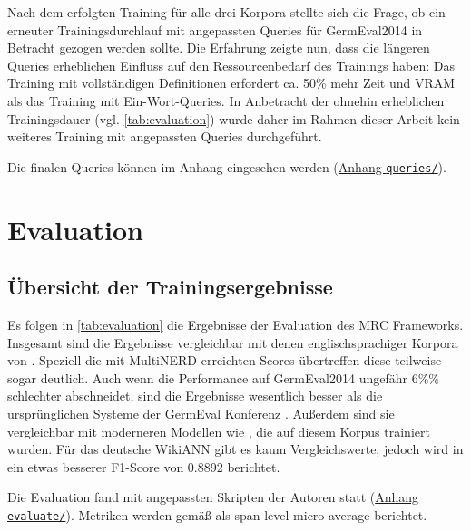 Nach dem erfolgten Training für alle drei Korpora stellte sich die Frage, ob ein erneuter Trainingsdurchlauf mit angepassten Queries für GermEval2014 in Betracht gezogen werden sollte. Die Erfahrung zeigte nun, dass die längeren Queries erheblichen Einfluss auf den Ressourcenbedarf des Trainings haben: Das Training mit vollständigen Definitionen erfordert ca. 50\% mehr Zeit und VRAM als das Training mit Ein-Wort-Queries. In Anbetracht der ohnehin erheblichen Trainingsdauer (vgl. \autoref{tab:evaluation}) wurde daher im Rahmen dieser Arbeit kein weiteres Training mit angepassten Queries durchgeführt.

Die finalen Queries können im Anhang eingesehen werden (\hyperref[app:queries]{Anhang \texttt{queries/}}).


\chapter{Evaluation}
\label{ch:Evaluation}

\section{Übersicht der Trainingsergebnisse}
\label{ch:Evaluation:sec:Übersicht_der_Trainingsergebnisse}

Es folgen in \autoref{tab:evaluation} die Ergebnisse der Evaluation des MRC Frameworks. Insgesamt sind die Ergebnisse vergleichbar mit denen englischsprachiger Korpora von . Speziell die mit MultiNERD erreichten Scores übertreffen diese teilweise sogar deutlich. Auch wenn die Performance auf GermEval2014 ungefähr 6\%\% schlechter abschneidet, sind die Ergebnisse wesentlich besser als die ursprünglichen Systeme der GermEval Konferenz \parencite{germeval2014}. Außerdem sind sie vergleichbar mit moderneren Modellen wie \textcite{riedl-pado-shootout}, die auf diesem Korpus trainiert wurden. Für das deutsche WikiANN gibt es kaum Vergleichswerte, jedoch wird in \textcite{Schiesser_2023} ein etwas besserer F1-Score von 0.8892 berichtet.

Die Evaluation fand mit angepassten Skripten der Autoren statt (\hyperref[app:evaluate]{Anhang \texttt{evaluate/}}). Metriken werden gemäß \textcite{li2019unified} als span-level micro-average berichtet.

